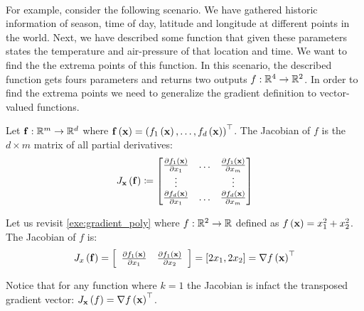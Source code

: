 ~\\ For example, consider the following scenario. We have gathered historic information of season, time of day, latitude and longitude at different points in the world. Next, we have described some function that given these parameters states the temperature and air-pressure of that location and time. We want to find the the extrema points of this function. In this scenario, the described function gets fours parameters and returns two outputs $f:\mathbb{R}^4\rightarrow\mathbb{R}^2$. In order to find the extrema points we need to generalize the gradient definition to vector-valued functions.
~\\
\begin{definition}[Jacobian]
	Let $\mathbf{f}:\mathbb{R}^m\rightarrow\mathbb{R}^d$ where $\mathbf{f}\left(\mathbf{x}\right)=\left(f_1\left(\mathbf{x}\right),\ldots, f_d\left(\mathbf{x}\right)\right)^\top$. The Jacobian of $f$ is the $d\times m$ matrix of all partial derivatives:
	\[
	J_{\mathbf{x}}\left(\mathbf{f}\right)\coloneqq\begin{bmatrix}\frac{\partial f_{1}\left(\mathbf{x}\right)}{\partial x_1} & \ldots & \frac{\partial f_1\left(\mathbf{x}\right)}{\partial x_m}\\
		\vdots &  & \vdots\\
		\frac{\partial f_d\left(\mathbf{x}\right)}{\partial x_1} & \ldots & \frac{\partial f_d\left(\mathbf{x}\right)}{\partial x_m}
	\end{bmatrix}
	\]
\end{definition}

\begin{example}
Let us revisit \autoref{exe:gradient_poly} where $f:\mathbb{R}^2\rightarrow\mathbb{R}$ defined as $f\left(\mathbf{x}\right)=x_1^2+x_2^2$. The Jacobian of $f$ is:
$$ J_{\\x}\left(\mathbf{f}\right)=\left[\begin{array}{cc}
	\frac{\partial f_1\left(\mathbf{x}\right)}{\partial x_1} & \frac{\partial f_1\left(\mathbf{x}\right)}{\partial x_2}\end{array}\right]=\left[2x_1,2x_2\right]=\nabla f\left(\mathbf{x}\right)^\top $$
\end{example}

Notice that for any function where $k=1$ the Jacobian is infact the transposed gradient vector: $J_{\mathbf{x}}\left(f\right)=\nabla f\left(\mathbf{x}\right)^\top$.


